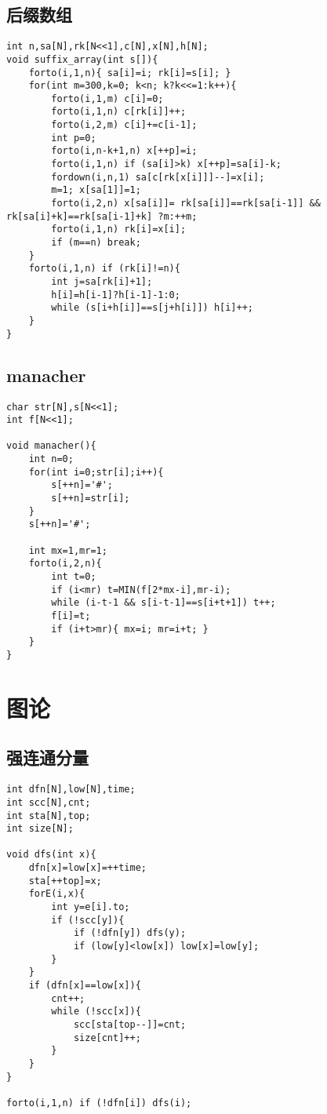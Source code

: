\documentclass{article}
\begin{document}
\subsection{后缀数组}
\begin{lstlisting}
int n,sa[N],rk[N<<1],c[N],x[N],h[N];
void suffix_array(int s[]){
	forto(i,1,n){ sa[i]=i; rk[i]=s[i]; }
	for(int m=300,k=0; k<n; k?k<<=1:k++){
		forto(i,1,m) c[i]=0;
		forto(i,1,n) c[rk[i]]++;
		forto(i,2,m) c[i]+=c[i-1];
		int p=0;
		forto(i,n-k+1,n) x[++p]=i;
		forto(i,1,n) if (sa[i]>k) x[++p]=sa[i]-k;
		fordown(i,n,1) sa[c[rk[x[i]]]--]=x[i];
		m=1; x[sa[1]]=1;
		forto(i,2,n) x[sa[i]]= rk[sa[i]]==rk[sa[i-1]] && rk[sa[i]+k]==rk[sa[i-1]+k] ?m:++m;
		forto(i,1,n) rk[i]=x[i];
		if (m==n) break;
	}
	forto(i,1,n) if (rk[i]!=n){
		int j=sa[rk[i]+1];
		h[i]=h[i-1]?h[i-1]-1:0;
		while (s[i+h[i]]==s[j+h[i]]) h[i]++;
	}
}
\end{lstlisting}

\subsection{manacher}
\begin{lstlisting}
char str[N],s[N<<1];
int f[N<<1];

void manacher(){
	int n=0;
	for(int i=0;str[i];i++){
		s[++n]='#';
		s[++n]=str[i];
	}
	s[++n]='#';

	int mx=1,mr=1;
	forto(i,2,n){
		int t=0;
		if (i<mr) t=MIN(f[2*mx-i],mr-i);
		while (i-t-1 && s[i-t-1]==s[i+t+1]) t++;
		f[i]=t;
		if (i+t>mr){ mx=i; mr=i+t; }
	}
}
\end{lstlisting}

\section{图论}

\subsection{强连通分量}
\begin{lstlisting}
int dfn[N],low[N],time;
int scc[N],cnt;
int sta[N],top;
int size[N];

void dfs(int x){
    dfn[x]=low[x]=++time;
    sta[++top]=x;
    forE(i,x){
        int y=e[i].to;
        if (!scc[y]){
            if (!dfn[y]) dfs(y);
            if (low[y]<low[x]) low[x]=low[y];
        }
    }
    if (dfn[x]==low[x]){
        cnt++;
        while (!scc[x]){
            scc[sta[top--]]=cnt;
            size[cnt]++;
        }
    }
}

forto(i,1,n) if (!dfn[i]) dfs(i);
\end{lstlisting}
\end{document}
